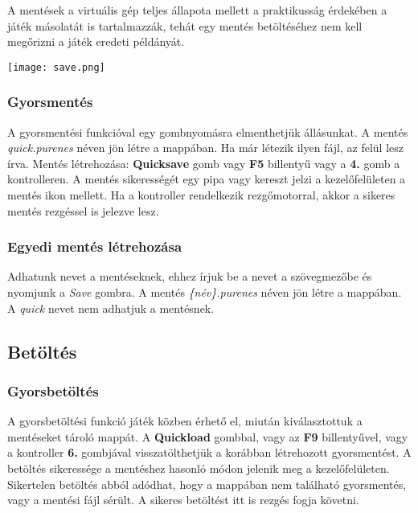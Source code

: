 A mentések a virtuális gép teljes állapota mellett a praktikusság érdekében a játék másolatát is tartalmazzák, tehát egy mentés betöltéséhez nem kell megőrizni a játék eredeti példányát.

\begin{center}
	\texttt{[image: save.png]}
\end{center}

\subsubsection{Gyorsmentés}

A gyorsmentési funkcióval egy gombnyomásra elmenthetjük állásunkat. A mentés \emph{quick.purenes} néven jön létre a mappában. Ha már létezik ilyen fájl, az felül lesz írva.
Mentés létrehozása: \textbf{Quicksave} gomb vagy \textbf{F5} billentyű vagy a \textbf{4.} gomb a kontrolleren.
A mentés sikerességét egy pipa vagy kereszt jelzi a kezelőfelületen a mentés ikon mellett.
Ha a kontroller rendelkezik rezgőmotorral, akkor a sikeres mentés rezgéssel is jelezve lesz.

\subsubsection{Egyedi mentés létrehozása}

Adhatunk nevet a mentéseknek, ehhez írjuk be a nevet a szövegmezőbe és nyomjunk a \emph{Save} gombra. A mentés \emph{\{név\}.purenes} néven jön létre a mappában. A \emph{quick} nevet nem adhatjuk a mentésnek.

\subsection{Betöltés}

\subsubsection{Gyorsbetöltés}

A gyorsbetöltési funkció játék közben érhető el, miután kiválasztottuk a mentéseket tároló mappát. A \textbf{Quickload} gombbal, vagy az \textbf{F9} billentyűvel, vagy a kontroller \textbf{6.} gombjával visszatölthetjük a korábban létrehozott gyorsmentést.
A betöltés sikeressége a mentéshez hasonló módon jelenik meg a kezelőfelületen.
Sikertelen betöltés abból adódhat, hogy a mappában nem található gyorsmentés, vagy a mentési fájl sérült.
A sikeres betöltést itt is rezgés fogja követni.

